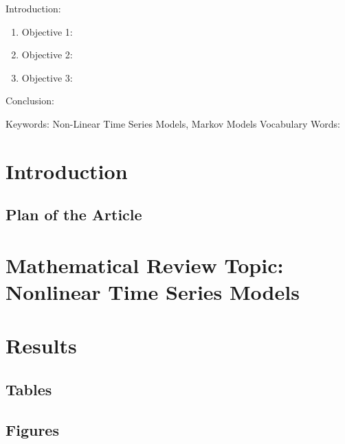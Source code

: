 

\twocolumn
\scriptsize
\begin{frontmatter}
		\title{}
		\author{}
		\address{The Mathematical Learning Space}
\end{frontmatter}	

Introduction:
\begin{enumerate}
\item Objective 1:
\item Objective 2:
\item Objective 3:
\end{enumerate}
Conclusion:

Keywords: Non-Linear Time Series Models, Markov Models
Vocabulary Words:

\section{Introduction}


\subsection{Plan of the Article}


\section{Mathematical Review Topic: Nonlinear Time Series Models}


\section{Results}

\subsection{Tables}

\subsection{Figures}

